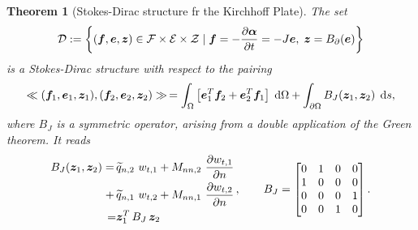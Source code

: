 \documentclass[preprint,12pt]{elsarticle}
\newtheorem{theorem}{Theorem}
\begin{document}
\begin{theorem}[Stokes-Dirac structure fr the Kirchhoff Plate]
	The set
\begin{equation}
\mathcal{D} := \left\{ (\bm{f},\bm{e},\bm{z}) \in \mathcal{F}\times\mathcal{E}\times\mathcal{Z} \; | \; \bm{f}= - \diffp{\bm{\alpha}}{t} = -J \bm{e}, \; \bm{z} = B_{\partial}(\bm{e}) \right\}
\end{equation} 
is a Stokes-Dirac structure with respect to the pairing
\begin{equation}
\ll (\bm{f}_1, \bm{e}_1, \bm{z}_1), (\bm{f}_2, \bm{e}_2, \bm{z}_2) \gg  \,= \int_{\Omega} \left[ \bm{e}_1^T \bm{f}_2 + \bm{e}_2^T \bm{f}_1 \right] \d{\Omega}  + \int_{\partial \Omega} B_J(\bm{z}_1, \bm{z}_2) \, \d{s},
\end{equation}
	where $B_J$ is a symmetric operator, arising from a double application of the Green theorem. It reads
	\begin{equation}
	\begin{aligned}
	B_J(\bm{z}_1,\bm{z}_2) = \, &\widetilde{q}_{n, 2} \ w_{t, 1} + M_{nn, 2} \ \diffp{w_{t, 1}}{n} \\
	+ \, &\widetilde{q}_{n, 1} \ w_{t, 2} + M_{nn, 1} \ \diffp{w_{t, 2}}{n} \\
	= &\bm{z}_1^T \, B_J \, \bm{z}_2 \\
	\end{aligned} \, , \qquad	B_J = 
	\begin{bmatrix}
	0 & 1 & 0 & 0 \\
	1 & 0 & 0 & 0 \\
	0 & 0 & 0 & 1 \\
	0 & 0 & 1 & 0 \\ 
	\end{bmatrix}.
	\end{equation}
\end{theorem}
\end{document}
